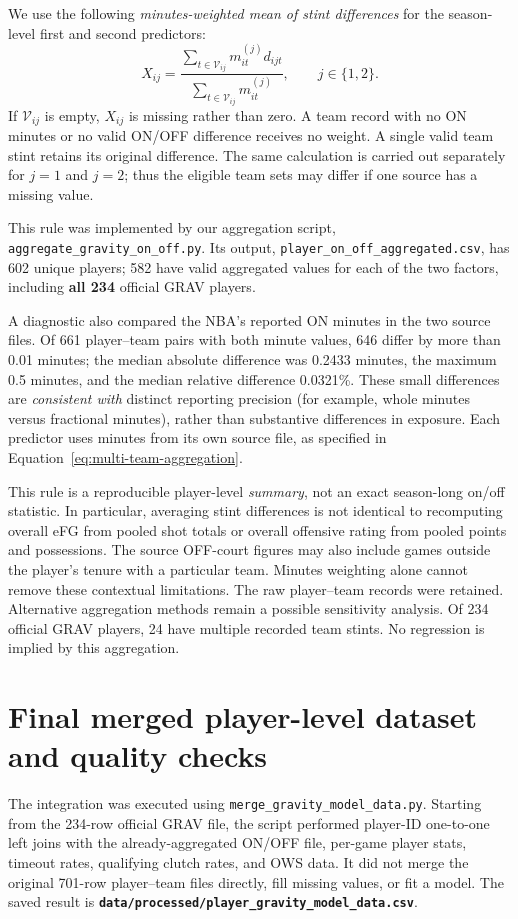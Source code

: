 \documentclass[11pt]{article}
\begin{document}
We use the following \emph{minutes-weighted mean of stint differences}
for the season-level first and second predictors:
\begin{equation}
 \boxed{
 X_{ij}=\frac{\displaystyle\sum_{t\in\mathcal{V}_{ij}}
 m_{it}^{(j)}d_{ijt}}{
 \displaystyle\sum_{t\in\mathcal{V}_{ij}}m_{it}^{(j)}}
 },\qquad j\in\{1,2\}.
 \label{eq:multi-team-aggregation}
\end{equation}
If $\mathcal{V}_{ij}$ is empty, $X_{ij}$ is missing rather than zero.
A team record with no ON minutes or no valid ON/OFF difference receives
no weight. A single valid team stint retains its original difference.
The same calculation is carried out separately for $j=1$ and $j=2$;
thus the eligible team sets may differ if one source has a missing value.

This rule was implemented by our aggregation script,
\texttt{aggregate\_gravity\_on\_off.py}.
Its output, \texttt{player\_on\_off\_aggregated.csv}, has
602 unique players; 582 have valid aggregated values
for each of the two factors, including \textbf{all 234} official GRAV players.

A diagnostic also compared the NBA's reported ON minutes in the two source
files. Of 661 player--team pairs with both minute values, 646 differ by
more than 0.01 minutes; the median absolute difference was 0.2433 minutes,
the maximum 0.5 minutes, and the median relative difference 0.0321\%.
These small differences are \emph{consistent with} distinct reporting
precision (for example, whole minutes versus fractional minutes), rather
than substantive differences in exposure. Each predictor uses minutes
from its own source file, as specified in Equation~\eqref{eq:multi-team-aggregation}.

This rule is a reproducible player-level \emph{summary}, not an exact
season-long on/off statistic. In particular, averaging stint differences
is not identical to recomputing overall eFG from pooled shot totals or
overall offensive rating from pooled points and possessions. The source
OFF-court figures may also include games outside the player's tenure
with a particular team. Minutes weighting alone cannot remove these
contextual limitations. The raw player--team records were retained.
Alternative aggregation methods remain a possible sensitivity analysis.
Of 234 official GRAV players, 24 have multiple recorded team stints.
No regression is implied by this aggregation.

\section{Final merged player-level dataset and quality checks}
The integration was executed using
\texttt{merge\_gravity\_model\_data.py}. Starting from the 234-row official
GRAV file, the script performed player-ID one-to-one left joins with
the already-aggregated ON/OFF file, per-game player stats, timeout rates,
qualifying clutch rates, and OWS data. It did not merge the original
701-row player--team files directly, fill missing values, or fit a model.
The saved result is \textbf{\texttt{data/processed/player\_gravity\_model\_data.csv}}.
\end{document}
